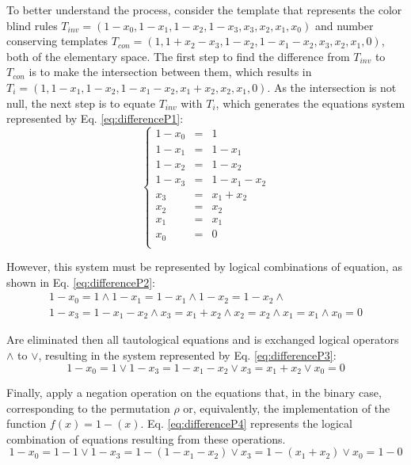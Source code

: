 \documentclass{llncs}
\begin{document}
To better understand the process, consider the template that represents the color blind rules $T_{inv} = (1 - x_0, 1 - x_1, 1 - x_2, 1 - x_3, x_3, x_2, x_1, x_0)$ and number conserving templates $T_{con} = (1, 1 + x_2 - x_3, 1 - x_2, 1 - x_1 - x_2, x_3, x_2, x_1, 0)$, both of the elementary space. The first step to find the difference from $T_{inv}$ to $T_{con}$ is to make the intersection between them, which results in $T_i = (1, 1 - x_1, 1 - x_2, 1 - x_1 - x_2, x_1 + x_2, x_2, x_1, 0)$. As the intersection is not null, the next step is to equate $T_{inv}$ with $T_i$, which generates the equations system represented by Eq. \ref{eq:differenceP1}: \begin{equation} \left\{\begin{matrix} 1 - x_0 & = & 1       \\ 1 - x_1  & = & 1 - x_1     \\ 1 - x_2  & = & 1 - x_2     \\ 1 - x_3  & = & 1 - x_1 - x_2 \\
x_3   & = & x_1 + x_2   \\
x_2   & = & x_2       \\
x_1   & = & x_1       \\
x_0   & = & 0       \\
\end{matrix}\right.
\label{eq:differenceP1}
\end{equation}

However, this system must be represented by logical combinations of equation, as shown in Eq. \ref{eq:differenceP2}:
\begin{equation}
\begin{split}
1 - x_0 = 1       \wedge
1 - x_1 = 1 - x_1   \wedge
1 - x_2 = 1 - x_2   \wedge\\
1 - x_3 = 1 - x_1 - x_2 \wedge 
x_3   = x_1 + x_2   \wedge
x_2   = x_2     \wedge
x_1   = x_1     \wedge
x_0   = 0       
\label{eq:differenceP2}
\end{split}
\end{equation}

Are eliminated then all tautological equations and is exchanged logical operators $\wedge$ to $\vee$, resulting in the system represented by Eq. \ref{eq:differenceP3}:
\begin{equation}
1 - x_0 = 1       \vee 
1 - x_3 = 1 - x_1 - x_2 \vee
x_3   = x_1 + x_2   \vee 
x_0   = 0       
\label{eq:differenceP3}
\end{equation}

Finally, apply a negation operation on the equations that, in the binary case, corresponding to the permutation $\rho $ or, equivalently, the implementation of the function $f(x) = 1 - (x)$. Eq. \ref{eq:differenceP4} represents the logical combination of equations resulting from these operations.
\begin{equation}
1 - x_0 = 1 - 1         \vee 
1 - x_3 = 1 - (1 - x_1 - x_2) \vee
x_3   = 1 - (x_1 + x_2)   \vee 
x_0   = 1 - 0       
\label{eq:differenceP4}
\end{equation}
\end{document}
